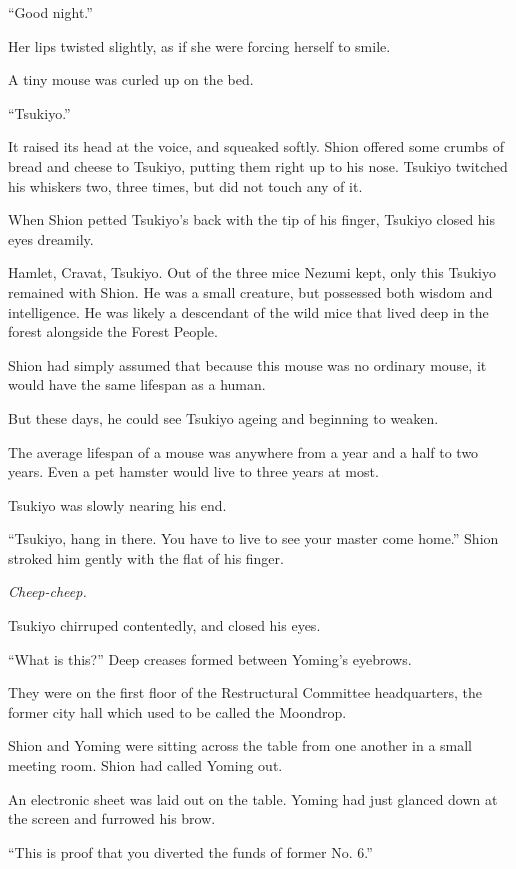 ``Good night.''

Her lips twisted slightly, as if she were forcing herself to smile.

\myspace

A tiny mouse was curled up on the bed.

``Tsukiyo.''

It raised its head at the voice, and squeaked softly. Shion offered some
crumbs of bread and cheese to Tsukiyo, putting them right up to his
nose. Tsukiyo twitched his whiskers two, three times, but did not touch
any of it.

When Shion petted Tsukiyo's back with the tip of his finger,
Tsukiyo closed his eyes dreamily.

Hamlet, Cravat, Tsukiyo. Out of the three mice Nezumi kept, only this
Tsukiyo remained with Shion. He was a small creature, but possessed both
wisdom and intelligence. He was likely a descendant of the wild mice
that lived deep in the forest alongside the Forest People.

Shion had simply assumed that because this mouse was no ordinary mouse,
it would have the same lifespan as a human.

But these days, he could see Tsukiyo ageing and beginning to weaken.

The average lifespan of a mouse was anywhere from a year and a half to
two years. Even a pet hamster would live to three years at most.

Tsukiyo was slowly nearing his end.

``Tsukiyo, hang in there. You have to live to see your master come
home.'' Shion stroked him gently with the flat of his finger.

\emph{Cheep-cheep.}

Tsukiyo chirruped contentedly, and closed his eyes.

\mybreak

``What is this?'' Deep creases formed between Yoming's eyebrows.

They were on the first floor of the Restructural Committee headquarters,
the former city hall which used to be called the Moondrop.

Shion and Yoming were sitting across the table from one another in a
small meeting room. Shion had called Yoming out.

An electronic sheet was laid out on the table. Yoming had just glanced
down at the screen and furrowed his brow.

``This is proof that you diverted the funds of former No. 6.''

